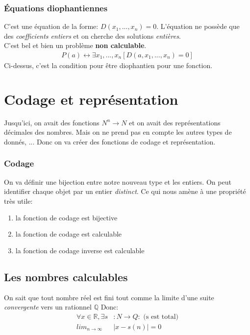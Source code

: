 \documentclass{report}
\begin{document}
\subsubsection{Équations diophantiennes}
C'est une équation de la forme: $D(x_1, ..., x_n) = 0$. L'équation ne possède que des \textit{coefficients entiers} et on cherche des solutions \textit{entières}.\\
C'est bel et bien un problème \textbf{non calculable}.
\begin{align*}
P(a) \leftrightarrow \exists x_1, ..., x_n [D(a,x_1, ..., x_n) = 0]
\end{align*}
Ci-dessus, c'est la condition pour être diophantien pour une fonction.

\section{Codage et représentation}
Jusqu'ici, on avait des fonctions $N^n \rightarrow N$ et on avait des représentations décimales des nombres. Mais on ne prend pas en compte les autres types de donnés, ... Donc on va créer des fonctions de codage et représentation.

\subsubsection{Codage}
On va définir une bijection entre notre nouveau type et les entiers. On peut identifier chaque objet par un entier \textit{distinct}. Ce qui nous amène à une propriété très utile:
\begin{enumerate}
\item la fonction de codage est bijective
\item la fonction de codage est calculable
\item la fonction de codage inverse est calculable
\end{enumerate}

\subsection{Les nombres calculables}
On sait que tout nombre réel est fini tout comme la limite d'une suite \textit{convergente} vers un rationnel $\mathbb{Q}$ Donc:
\begin{align*}
\forall x \in \mathbb{R}, \exists s &: N \rightarrow Q : \text{ (s est total)}\\
lim_{n\rightarrow \infty} &| x - s(n)| = 0
\end{align*}
\end{document}
